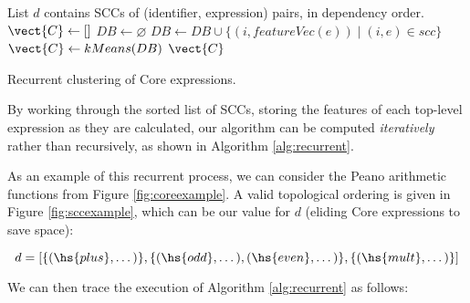 \begin{algorithm}
  \begin{algorithmic}[1]
    \Require List $d$ contains SCCs of (identifier, expression) pairs, in
    dependency order.
      \State $\vect{C} \gets []$
      \State $DB \gets \varnothing$
        \State $DB \gets DB \cup \{(i, featureVec(e)) \mid (i, e) \in scc\}$
        \State $\vect{C} \gets kMeans(DB)$
      \EndFor
      \Return $\vect{C}$
    \EndProcedure
  \end{algorithmic}
  \caption{Recurrent clustering of Core expressions.}
  \label{alg:recurrent}
\end{algorithm}

By working through the sorted list of SCCs, storing the features of each
top-level expression as they are calculated, our algorithm can be computed
\emph{iteratively} rather than recursively, as shown in Algorithm
\ref{alg:recurrent}.

\iffalse

As an example of this recurrent process, we can consider the Peano arithmetic
functions from Figure \ref{fig:coreexample}. A valid topological ordering is
given in Figure \ref{fig:sccexample}, which can be our value for $d$ (eliding
Core expressions to save space):

\begin{equation}
  d = [\{(\hs{plus}, \dots)\},
       \{(\hs{odd}, \dots), (\hs{even}, \dots)\},
       \{(\hs{mult}, \dots)\}]
\end{equation}

We can then trace the execution of Algorithm \ref{alg:recurrent} as follows:

